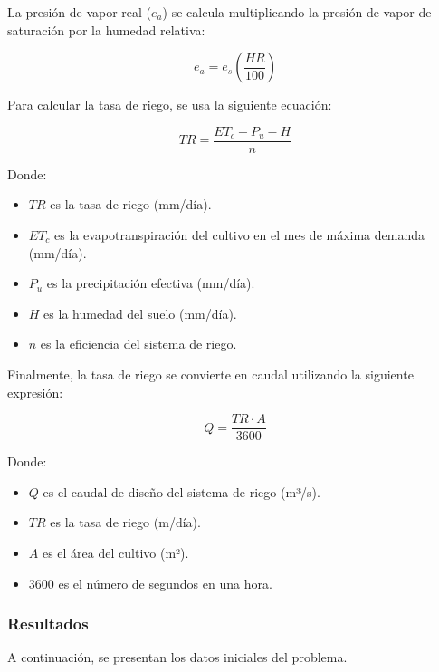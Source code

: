 \documentclass{article}  %
\begin{document}
La presión de vapor real ($e_a$) se calcula multiplicando la presión de vapor de saturación por la humedad relativa:

\begin{equation}
  e_a = e_s \left( \frac{HR}{100} \right)
\end{equation}

Para calcular la tasa de riego, se usa la siguiente ecuación:

\begin{equation}
  TR = \frac{ET_c - P_u - H}{n}
\end{equation}

Donde:

\begin{itemize}
  \item $TR$ es la tasa de riego (mm/día).
  \item $ET_c$ es la evapotranspiración del cultivo en el mes de máxima demanda (mm/día).
  \item $P_u$ es la precipitación efectiva (mm/día).
  \item $H$ es la humedad del suelo (mm/día).
  \item $n$ es la eficiencia del sistema de riego.
\end{itemize}

Finalmente, la tasa de riego se convierte en caudal utilizando la siguiente expresión:

\begin{equation}
  Q = \frac{TR \cdot A}{3600}
\end{equation}

Donde:

\begin{itemize}
  \item $Q$ es el caudal de diseño del sistema de riego (m³/s).
  \item $TR$ es la tasa de riego (m/día).
  \item $A$ es el área del cultivo (m²).
  \item $3600$ es el número de segundos en una hora.
\end{itemize}

\subsubsection{Resultados}

A continuación, se presentan los datos iniciales del problema.
\end{document}
